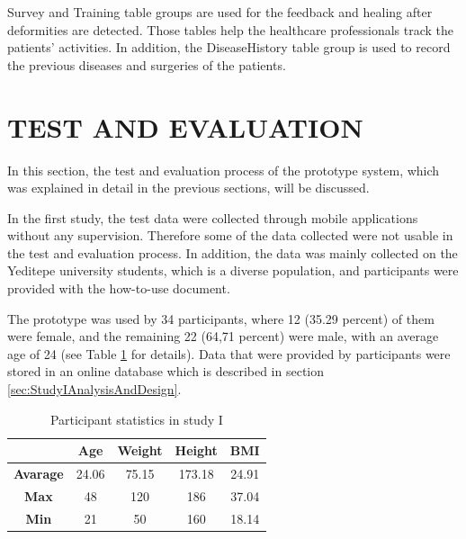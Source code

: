 Survey and Training table groups are used for the feedback and healing after deformities are detected. Those tables help the healthcare professionals track the patients' activities. In addition, the DiseaseHistory table group is used to record the previous diseases and surgeries of the patients.

\section{TEST AND EVALUATION} \label{sec:StudyITestAndEvaluation}

In this section, the test and evaluation process of the prototype system, which was explained in detail in the previous sections, will be discussed.

In the first study, the test data were collected through mobile applications without any supervision. Therefore some of the data collected were not usable in the test and evaluation process. In addition, the data was mainly collected on the Yeditepe university students, which is a diverse population, and participants were provided with the how-to-use document.

The prototype was used by 34 participants, where 12 (35.29 percent) of them were female, and the remaining 22 (64,71 percent) were male, with an average age of 24 (see Table \ref{tab:StudyIParticipantStatistics} for details). Data that were provided by participants were stored in an online database which is described in section \ref{sec:StudyIAnalysisAndDesign}.


\begin{table}[htbp]
\begin{center}
\caption{Participant statistics in study I}
      \begin{tabular}{|c|c|c|c|c|} \hline
          & \textbf{Age} & \textbf{Weight} & \textbf{Height} & \textbf{BMI} \\ \hline
        \textbf{Avarage} & 24.06 & 75.15 & 173.18 & 24.91 \\ \hline
        \textbf{Max} & 48 & 120 & 186 & 37.04 \\ \hline
        \textbf{Min} & 21 & 50 & 160 & 18.14 \\ \hline
    \end{tabular}
\label{tab:StudyIParticipantStatistics}
\end{center}
\end{table}

